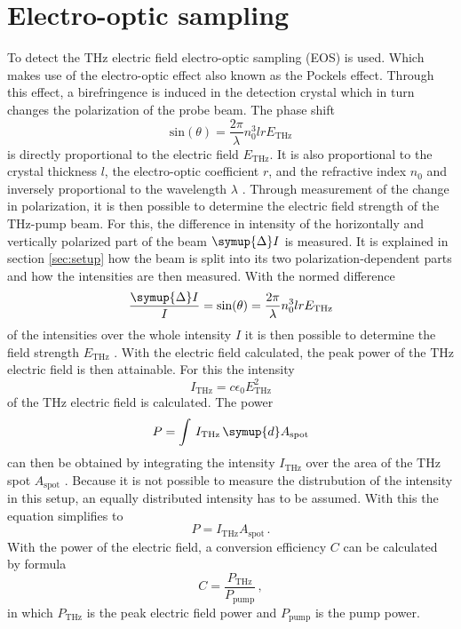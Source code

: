 \section{Electro-optic sampling}\label{sec:eos}
To detect the $\si{\tera\hertz}$ electric field electro-optic sampling (EOS) is used.
Which makes use of the electro-optic effect also known as the Pockels effect.
Through this effect, a birefringence is induced in the detection crystal which in turn changes the polarization of the probe beam.
The phase shift 
\begin{equation}
    \text{sin}(\theta) = \frac{2\pi}{\lambda} n_0^3 l r E_\text{THz}
\end{equation}
is directly proportional to the electric field $E_\text{THz}$. 
It is also proportional to the crystal thickness $l$, the electro-optic coefficient $r$, and the refractive index $n_0$ and inversely proportional to the wavelength $\lambda$ \cite{wiki_book}. 
Through measurement of the change in polarization, it is then possible to determine the electric field strength of the $\si{\tera\hertz}$-pump beam.
For this, the difference in intensity of the horizontally and vertically polarized part of the beam $\symup{\Delta}I$ is measured.
It is explained in section \ref{sec:setup} how the beam is split into its two polarization-dependent parts and how the intensities are then measured.
With the normed difference 
\begin{equation}
    \frac{\symup{\Delta}I}{I} = \text{sin}(\theta) = \frac{2\pi}{\lambda} n_0^3 l r E_\text{THz}
    \label{eq:electricfield_A_B}
\end{equation}
of the intensities over the whole intensity $I$ it is then possible to determine the field strength $E_\text{THz}$ \cite{THZ_eltric_field}.
With the electric field calculated, the peak power of the $\si{\tera\hertz}$ electric field is then attainable.
For this the intensity
\begin{equation}
    I_\text{THz} = c \epsilon_0 E_\text{THz}^2
    \label{eq:intensity}
\end{equation}
of the $\si{\tera\hertz}$ electric field is calculated.
The power 
\begin{equation}
    P = \int\, I_\text{THz} \,\symup{d}A_\text{spot}
\end{equation}
can then be obtained by integrating the intensity $I_\text{THz}$ over the area of the $\si{\tera\hertz}$ spot $A_\text{spot}$ \cite{griffiths}.
Because it is not possible to measure the distrubution of the intensity in this setup, an equally distributed intensity has to be assumed.
With this the equation simplifies to 
\begin{equation}
    P = I_\text{THz} A_\text{spot}\,.
    \label{eq:power}
\end{equation}
With the power of the electric field, a conversion efficiency $C$ can be calculated by formula
\begin{equation}
    C = \frac{P_\text{THz}}{P_\text{pump}} \, ,
    \label{eq:conversion}
\end{equation}
in which $P_\text{THz}$ is the peak electric field power and $P_\text{pump}$ is the pump power.


